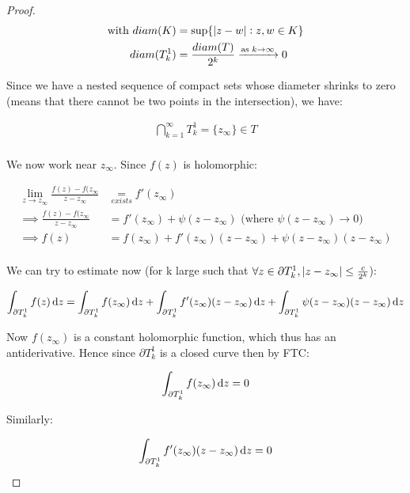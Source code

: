 \begin{proof}
\begin{align*}
    \text{with } diam(K) &= \sup\{ \, \abs{z-w} : z,w\in K \}\\
    diam(T_k^1) &= \frac{diam(T)}{2^k} \xrightarrow[]{\text{as } k\rightarrow \infty} 0\\
\end{align*}

Since we have a nested sequence of compact sets whose diameter shrinks to zero (means that there cannot be two points in the intersection), we have:

\begin{align*}
    \bigcap_{k=1}^\infty T_k^1 = \{ z_\infty \} \in T\\
\end{align*}



We now work near $z_\infty$. Since $f(z)$ is holomorphic:

\begin{align*}
    \lim_{z\rightarrow z_\infty} \frac{f(z) - f(z_\infty}{z-z_\infty} &\underset{exists}{=} f'(z_\infty)\\
    \implies \frac{f(z) - f(z_\infty}{z-z_\infty} &= f'(z_\infty) + \psi(z-z_\infty) \text{ (where $\psi(z-z_\infty) \rightarrow 0$)}\\
    \implies f(z) &= f(z_\infty)+f'(z_\infty)(z-z_\infty) + \psi(z-z_\infty)(z-z_\infty)\\
\end{align*}

We can try to estimate now (for k large such that $\forall z\in \partial T_k^1, \, \abs{z-z_\infty} \leq \frac{c}{2^k}$): 

\begin{align*}
    \int_{\partial T_k^1} f(z)  \dif z = \int_{\partial T_k^1} f(z_\infty)  \dif z + \int_{\partial T_k^1} f'(z_\infty)(z-z_\infty)  \dif z + \int_{\partial T_k^1} \psi(z-z_\infty)(z-z_\infty)  \dif z
\end{align*}

Now $f(z_\infty)$ is a constant holomorphic function, which thus has an antiderivative. Hence since $\partial T_k^1$ is a closed curve then by FTC:

\begin{align*}
    \int_{\partial T_k^1} f(z_\infty)  \dif z = 0
\end{align*}

Similarly:

\begin{align*}
    \int_{\partial T_k^1} f'(z_\infty)(z-z_\infty)  \dif z = 0
\end{align*}


\end{proof}

